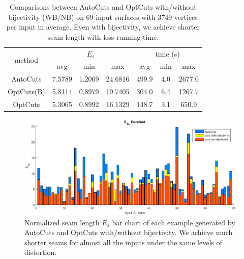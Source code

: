 \begin{table}[!h]
\centering
\caption{Comparisons between AutoCuts and OptCuts with/without bijectivity (WB/NB) on 69 input surfaces with $3749$ vertices per input in average. Even with bijectivity, we achieve shorter seam length with less running time.}
\label{tb:comp_AutoCuts}
\begin{tabular}{|c|ccc|ccc|}
\hline
\multirow{2}{*}{method} & \multicolumn{3}{c|}{$E_{s}$} & \multicolumn{3}{c|}{time (s)} \\ \cline{2-7} 
                        & avg      & min     & max      & avg      & min    & max       \\ \hline
AutoCuts                & 7.5789   & 1.2069  & 24.6816  & 499.9    & 4.0    & 2677.0    \\
OptCuts(B)               & 5.8114   & 0.8979  & 19.7405  & 304.0    & 6.4    & 1267.7     \\
OptCuts               & 5.3065   & 0.8992  & 16.1329  & 148.7    & 3.1    & 650.9    \\ \hline
\end{tabular}
\end{table}

\begin{figure}[!h]
\centering
\includegraphics[width=\linewidth]{fig/ESLBar_compAutoCuts.png}
\caption{Normalized seam length $E_{s}$ bar chart of each example generated by AutoCuts and OptCuts with/without bijectivity. We achieve much shorter seams for almost all the inputs under the same levels of distortion.}
\label{fig:ESLBar_compAutoCuts}
\end{figure}

